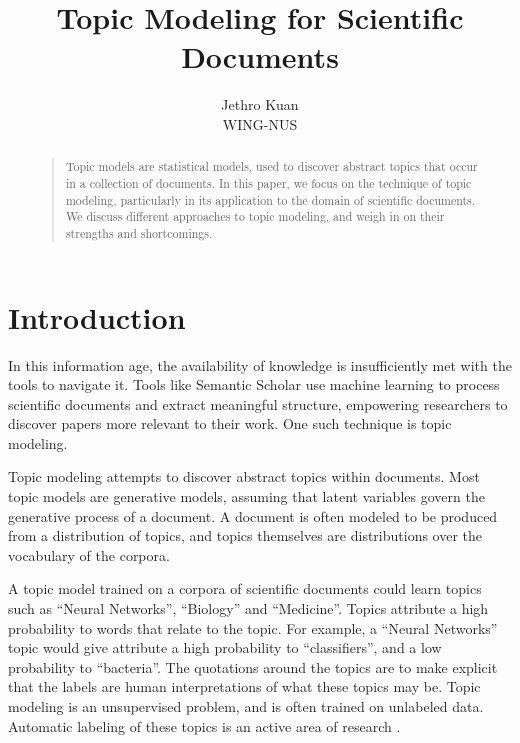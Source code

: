 \documentclass[letterpaper]{article}
\begin{document}
\nocopyright


\title{Topic Modeling for Scientific Documents}
\author{Jethro Kuan \\
  WING-NUS\\
}
\maketitle
\begin{abstract}
  \begin{quote}
    Topic models are statistical models, used to discover abstract
    topics that occur in a collection of documents. In this paper, we
    focus on the technique of topic modeling, particularly in its
    application to the domain of scientific documents. We discuss
    different approaches to topic modeling, and weigh in on their
    strengths and shortcomings.
  \end{quote}
\end{abstract}

\section{Introduction}
In this information age, the availability of knowledge is
insufficiently met with the tools to navigate it. Tools like Semantic
Scholar use machine learning to process scientific documents and
extract meaningful structure, empowering researchers to discover
papers more relevant to their work. One such technique is topic
modeling.

Topic modeling attempts to discover abstract topics within documents.
Most topic models are generative models, assuming that latent
variables govern the generative process of a document. A document is
often modeled to be produced from a distribution of topics, and topics
themselves are distributions over the vocabulary of the corpora.

A topic model trained on a corpora of scientific documents could learn
topics such as ``Neural Networks'', ``Biology'' and ``Medicine''.
Topics attribute a high probability to words that relate to the topic.
For example, a ``Neural Networks'' topic would give attribute a high
probability to ``classifiers'', and a low probability to ``bacteria''.
The quotations around the topics are to make explicit that the labels
are human interpretations of what these topics may be. Topic modeling
is an unsupervised problem, and is often trained on unlabeled data.
Automatic labeling of these topics is an active area of research
\citep{mei2007automatic, lau2011automatic}.
\end{document}
